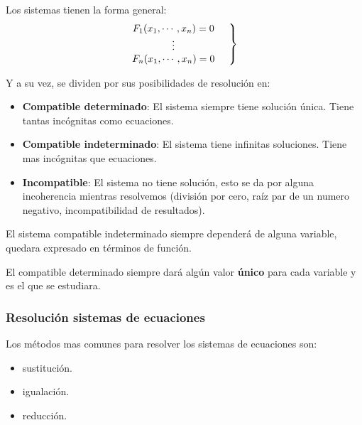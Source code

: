 \documentclass[12pt]{article}
\begin{document}
    Los sistemas tienen la forma general:
    \begin{equation*}
        \left.
        \begin{matrix}
            F_1(x_1,\cdots,x_n)=0\\
            \vdots\\
            F_n(x_1,\cdots,x_n)=0
        \end{matrix}
        \hspace*{0.5cm}\right\rbrace
    \end{equation*}

    Y a su vez, se dividen por sus posibilidades de resolución en:

    \begin{itemize}
        \item \textbf{Compatible determinado}: El sistema siempre tiene solución única.
            Tiene tantas incógnitas como ecuaciones.

        \item \textbf{Compatible indeterminado}: El sistema tiene infinitas soluciones.
            Tiene mas incógnitas que ecuaciones.

        \item \textbf{Incompatible}: El sistema no tiene solución, esto se da por alguna
            incoherencia mientras resolvemos (división por cero, raíz par de un numero
            negativo, incompatibilidad de resultados).
    \end{itemize}

    El sistema compatible indeterminado siempre dependerá de alguna variable,
    quedara expresado en términos de función.

    El compatible determinado siempre dará algún valor \textbf{único} para cada
    variable y es el que se estudiara.

    \subsubsection{Resolución sistemas de ecuaciones}

    Los métodos mas comunes para resolver los sistemas de ecuaciones son:

    \begin{itemize}
        \item sustitución.
        \item igualación.
        \item reducción.
    \end{itemize}
\end{document}

